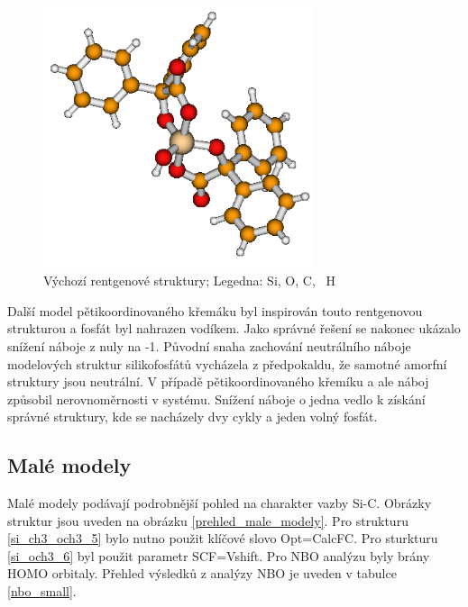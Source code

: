 \documentclass[
  digital, %
  table,   %
  lof,     %
  lot,     %
  oneside,
]{fithesis3}
\begin{document}
\begin{figure}
\begin{center}
\includegraphics[width=8cm]{rtg_5_koordinace.png}
\caption{  Výchozí rentgenové struktury;  Legedna:  Si,  O,  C, ~H}
\label{rtg_5}
\end{center}
\end{figure}
Další model pětikoordinovaného křemáku byl inspirován touto rentgenovou strukturou a fosfát byl nahrazen vodíkem. Jako správné řešení se nakonec ukázalo snížení náboje z nuly na -1. Původní snaha zachování neutrálního náboje modelových struktur silikofosfátů vycházela z předpokaldu, že samotné amorfní struktury jsou neutrální. V případě pětikoordinovaného křemíku a ale náboj způsobil nerovnoměrnosti v systému. Snížení náboje o jedna vedlo k získání správné struktury, kde se nacházely dvy cykly a jeden volný fosfát.




\subsection{Malé modely}
Malé modely podávají podrobnější pohled na charakter vazby Si-C. Obrázky struktur jsou uveden na obrázku \ref{prehled_male_modely}. Pro strukturu  \ref{si_ch3_och3_5} bylo nutno použit klíčové slovo Opt=CalcFC. Pro sturkturu  \ref{si_och3_6} byl použit parametr SCF=Vshift. Pro NBO analýzu byly brány HOMO orbitaly. Přehled výsledků z analýzy NBO je uveden v tabulce \ref{nbo_small}.
\end{document}
